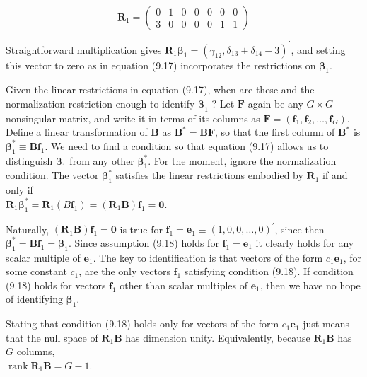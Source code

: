 \documentclass[10pt]{article}
\begin{document}
$$
\mathbf{R}_{1}=\left(\begin{array}{lllllll}
0 & 1 & 0 & 0 & 0 & 0 & 0 \\
3 & 0 & 0 & 0 & 0 & 1 & 1
\end{array}\right)
$$

Straightforward multiplication gives $\mathbf{R}_{1} \boldsymbol{\beta}_{1}=\left(\gamma_{12}, \delta_{13}+\delta_{14}-3\right)^{\prime}$, and setting this vector to zero as in equation (9.17) incorporates the restrictions on $\boldsymbol{\beta}_{1}$.

Given the linear restrictions in equation (9.17), when are these and the normalization restriction enough to identify $\boldsymbol{\beta}_{1}$ ? Let $\mathbf{F}$ again be any $G \times G$ nonsingular matrix, and write it in terms of its columns as $\mathbf{F}=\left(\mathbf{f}_{1}, \mathbf{f}_{2}, \ldots, \mathbf{f}_{G}\right)$. Define a linear transformation of $\mathbf{B}$ as $\mathbf{B}^{*}=\mathbf{B F}$, so that the first column of $\mathbf{B}^{*}$ is $\boldsymbol{\beta}_{1}^{*} \equiv \mathbf{B f}_{1}$. We need to find a condition so that equation (9.17) allows us to distinguish $\boldsymbol{\beta}_{1}$ from any other $\boldsymbol{\beta}_{1}^{*}$. For the moment, ignore the normalization condition. The vector $\boldsymbol{\beta}_{1}^{*}$ satisfies the linear restrictions embodied by $\mathbf{R}_{1}$ if and only if\\
$\mathbf{R}_{1} \boldsymbol{\beta}_{1}^{*}=\mathbf{R}_{1}\left(B \mathbf{f}_{1}\right)=\left(\mathbf{R}_{1} \mathbf{B}\right) \mathbf{f}_{1}=\mathbf{0}$.

Naturally, $\left(\mathbf{R}_{1} \mathbf{B}\right) \mathbf{f}_{1}=\mathbf{0}$ is true for $\mathbf{f}_{1}=\mathbf{e}_{1} \equiv(1,0,0, \ldots, 0)^{\prime}$, since then $\boldsymbol{\beta}_{1}^{*}=\mathbf{B f}_{1}= \boldsymbol{\beta}_{1}$. Since assumption (9.18) holds for $\mathbf{f}_{1}=\mathbf{e}_{1}$ it clearly holds for any scalar multiple of $\mathbf{e}_{1}$. The key to identification is that vectors of the form $c_{1} \mathbf{e}_{1}$, for some constant $c_{1}$, are the only vectors $\mathbf{f}_{1}$ satisfying condition (9.18). If condition (9.18) holds for vectors $\mathbf{f}_{1}$ other than scalar multiples of $\mathbf{e}_{1}$, then we have no hope of identifying $\boldsymbol{\beta}_{1}$.

Stating that condition (9.18) holds only for vectors of the form $c_{1} \mathbf{e}_{1}$ just means that the null space of $\mathbf{R}_{1} \mathbf{B}$ has dimension unity. Equivalently, because $\mathbf{R}_{1} \mathbf{B}$ has $G$ columns,\\
$\operatorname{rank} \mathbf{R}_{1} \mathbf{B}=G-1$.
\end{document}
